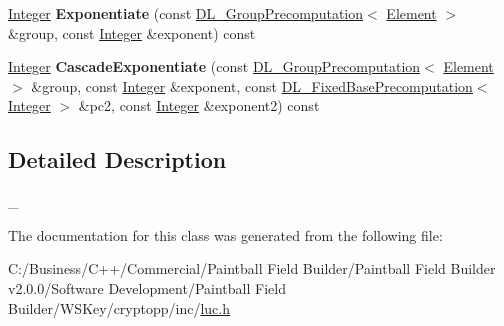 \begin{DoxyCompactItemize}
\item 
\hypertarget{class_d_l___base_precomputation___l_u_c_afae3f21615a2df17ecd5e204aeb3ac75}{
\hyperlink{class_integer}{Integer} {\bfseries Exponentiate} (const \hyperlink{class_d_l___group_precomputation}{DL\_\-GroupPrecomputation}$<$ \hyperlink{class_integer}{Element} $>$ \&group, const \hyperlink{class_integer}{Integer} \&exponent) const }
\label{class_d_l___base_precomputation___l_u_c_afae3f21615a2df17ecd5e204aeb3ac75}

\item 
\hypertarget{class_d_l___base_precomputation___l_u_c_abc7aa45c73d448e325c33eb3a2eac254}{
\hyperlink{class_integer}{Integer} {\bfseries CascadeExponentiate} (const \hyperlink{class_d_l___group_precomputation}{DL\_\-GroupPrecomputation}$<$ \hyperlink{class_integer}{Element} $>$ \&group, const \hyperlink{class_integer}{Integer} \&exponent, const \hyperlink{class_d_l___fixed_base_precomputation}{DL\_\-FixedBasePrecomputation}$<$ \hyperlink{class_integer}{Integer} $>$ \&pc2, const \hyperlink{class_integer}{Integer} \&exponent2) const }
\label{class_d_l___base_precomputation___l_u_c_abc7aa45c73d448e325c33eb3a2eac254}

\end{DoxyCompactItemize}


\subsection{Detailed Description}
\_\- 

The documentation for this class was generated from the following file:\begin{DoxyCompactItemize}
\item 
C:/Business/C++/Commercial/Paintball Field Builder/Paintball Field Builder v2.0.0/Software Development/Paintball Field Builder/WSKey/cryptopp/inc/\hyperlink{luc_8h}{luc.h}\end{DoxyCompactItemize}
